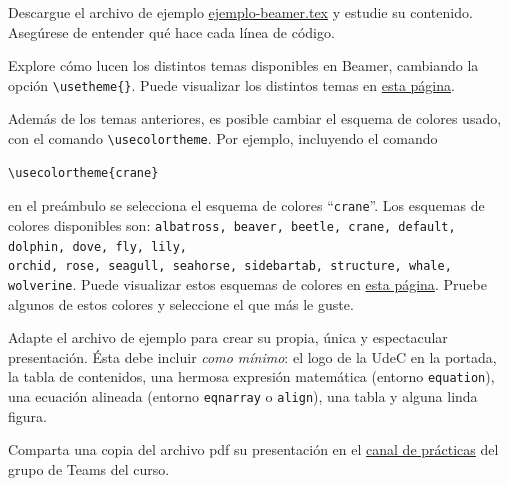 \documentclass[11pt]{exam}
\begin{document}
\begin{questions}

\item Descargue el archivo de ejemplo \href{https://raw.githubusercontent.com/gfrubi/CC/master/LaTeX/ejemplo-beamer.tex}{ejemplo-beamer.tex} y estudie su contenido. Asegúrese de entender qué hace cada línea de código.
\item Explore cómo lucen los distintos temas disponibles en Beamer, cambiando la opción \verb|\usetheme{}|. Puede visualizar los distintos temas en \href{https://deic.uab.cat/~iblanes/beamer_gallery/index_by_theme.html}{esta página}.

\item Además de los temas anteriores, es posible cambiar el esquema de colores usado, con el comando \verb|\usecolortheme|. Por ejemplo, incluyendo el comando 
\begin{verbatim}
\usecolortheme{crane}
\end{verbatim}
en el preámbulo se selecciona el esquema de colores ``\texttt{crane}''. Los esquemas de colores disponibles son: \texttt{albatross, beaver, beetle, crane, default, dolphin, dove, fly, lily, \\ orchid, rose, seagull, seahorse, sidebartab, structure, whale, wolverine}. Puede visualizar estos esquemas de colores en \href{https://deic.uab.cat/~iblanes/beamer_gallery/index_by_color.html}{esta página}. Pruebe algunos de estos colores y seleccione el que más le guste.

\item Adapte el archivo de ejemplo para crear su propia, única y espectacular presentación. Ésta debe incluir \textit{como mínimo}: el logo de la UdeC en la portada, la tabla de contenidos, una hermosa expresión matemática (entorno \texttt{equation}), una ecuación alineada (entorno \texttt{eqnarray} o \texttt{align}), una tabla y alguna linda figura.
\item Comparta una copia del archivo pdf su presentación en el \href{https://teams.microsoft.com/l/channel/19\%3A0eb4de3be39d4ec58b358183deac148e\%40thread.tacv2/Pr\%C3\%A1cticas?groupId=af331fa5-cef0-46e7-b7b4-a49752041309&tenantId=56582b9e-8824-49d0-a665-cd328c0e004a}{canal de prácticas} del grupo de Teams del curso.


\end{questions}
\end{document}
